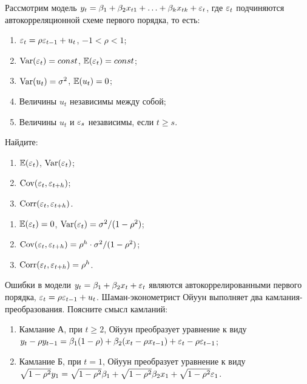 \begin{problem}
Рассмотрим модель $y_t=\beta_1+\beta_2 x_{t1}+\ldots+\beta_k x_{tk}+\varepsilon_t$, 
где $\varepsilon_t$ подчиняются автокорреляционной схеме первого порядка, то есть:
\begin{enumerate}
\item $\varepsilon_t=\rho \varepsilon_{t-1}+u_t$, $-1<\rho<1$;
\item $\operatorname{Var}(\varepsilon_t)=const$, $\mathbb{E}(\varepsilon_t)=const$;
\item $\operatorname{Var}(u_t)=\sigma^2$, $\mathbb{E}(u_t)=0$;
\item Величины $u_t$ независимы между собой;
\item Величины $u_t$ и $\varepsilon_s$ независимы, если $t\geq s$.
\end{enumerate}
Найдите:
\begin{enumerate}
\item $\mathbb{E}(\varepsilon_t)$, $\operatorname{Var}(\varepsilon_t)$;
\item $\operatorname{Cov}(\varepsilon_t,\varepsilon_{t+h})$;
\item $\operatorname{Corr}(\varepsilon_t,\varepsilon_{t+h})$.
\end{enumerate}


\begin{sol}
\begin{enumerate}
\item $\mathbb{E}(\varepsilon_t)=0$, $\operatorname{Var}(\varepsilon_t)=\sigma^2/(1-\rho^2)$;
\item $\operatorname{Cov}(\varepsilon_t,\varepsilon_{t+h})=\rho^h\cdot \sigma^2/(1-\rho^2)$;
\item $\operatorname{Corr}(\varepsilon_t,\varepsilon_{t+h})=\rho^h$.
\end{enumerate}
\end{sol}
\end{problem}




\begin{problem}
Ошибки в модели $y_t=\beta_1+\beta_2 x_{t}+\varepsilon_t$ являются автокоррелированными первого порядка, $\varepsilon_t=\rho \varepsilon_{t-1}+u_t$. Шаман-эконометрист Ойуун выполняет два камлания-преобразования. Поясните смысл камланий:
\begin{enumerate}
\item Камлание А, при $t\geq 2$, Ойуун преобразует уравнение к виду $y_t-\rho y_{t-1}=\beta_1(1-\rho)+ \beta_2(x_t-\rho x_{t-1})+\varepsilon_t-\rho \varepsilon_{t-1}$;
\item Камлание Б, при $t=1$, Ойуун преобразует уравнение к виду $\sqrt{1-\rho^2}y_1=\sqrt{1-\rho^2}\beta_1+\sqrt{1-\rho^2}\beta_2 x_1+\sqrt{1-\rho^2}\varepsilon_1$.
\end{enumerate}


\begin{sol}
\end{sol}
\end{problem}



